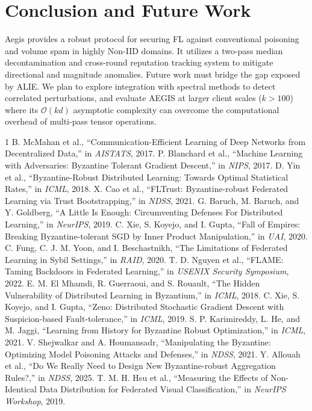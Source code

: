 \documentclass[10pt, conference]{IEEEtran}
\begin{document}
\section{Conclusion and Future Work}
Aegis provides a robust protocol for securing FL against conventional poisoning and volume spam in highly Non-IID domains. It utilizes a two-pass median decontamination and cross-round reputation tracking system to mitigate directional and magnitude anomalies. Future work must bridge the gap exposed by ALIE. We plan to explore integration with spectral methods to detect correlated perturbations, and evaluate AEGIS at larger client scales ($k > 100$) where its $\mathcal{O}(kd)$ asymptotic complexity can overcome the computational overhead of multi-pass tensor operations.


\begin{thebibliography}{1}
B. McMahan et al., ``Communication-Efficient Learning of Deep Networks from Decentralized Data,'' in \textit{AISTATS}, 2017.
P. Blanchard et al., ``Machine Learning with Adversaries: Byzantine Tolerant Gradient Descent,'' in \textit{NIPS}, 2017.
D. Yin et al., ``Byzantine-Robust Distributed Learning: Towards Optimal Statistical Rates,'' in \textit{ICML}, 2018.
X. Cao et al., ``FLTrust: Byzantine-robust Federated Learning via Trust Bootstrapping,'' in \textit{NDSS}, 2021.
G. Baruch, M. Baruch, and Y. Goldberg, ``A Little Is Enough: Circumventing Defenses For Distributed Learning,'' in \textit{NeurIPS}, 2019.
C. Xie, S. Koyejo, and I. Gupta, ``Fall of Empires: Breaking Byzantine-tolerant SGD by Inner Product Manipulation,'' in \textit{UAI}, 2020.
C. Fung, C. J. M. Yoon, and I. Beschastnikh, ``The Limitations of Federated Learning in Sybil Settings,'' in \textit{RAID}, 2020.
T. D. Nguyen et al., ``FLAME: Taming Backdoors in Federated Learning,'' in \textit{USENIX Security Symposium}, 2022.
E. M. El Mhamdi, R. Guerraoui, and S. Rouault, ``The Hidden Vulnerability of Distributed Learning in Byzantium,'' in \textit{ICML}, 2018.
C. Xie, S. Koyejo, and I. Gupta, ``Zeno: Distributed Stochastic Gradient Descent with Suspicion-based Fault-tolerance,'' in \textit{ICML}, 2019.
S. P. Karimireddy, L. He, and M. Jaggi, ``Learning from History for Byzantine Robust Optimization,'' in \textit{ICML}, 2021.
V. Shejwalkar and A. Houmansadr, ``Manipulating the Byzantine: Optimizing Model Poisoning Attacks and Defenses,'' in \textit{NDSS}, 2021.
Y. Allouah et al., ``Do We Really Need to Design New Byzantine-robust Aggregation Rules?,'' in \textit{NDSS}, 2025.
T. M. H. Hsu et al., ``Measuring the Effects of Non-Identical Data Distribution for Federated Visual Classification,'' in \textit{NeurIPS Workshop}, 2019.
\end{thebibliography}
\end{document}
